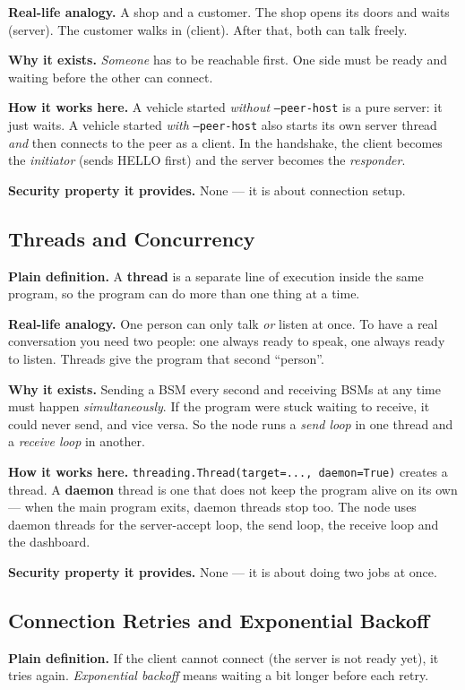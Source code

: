 \documentclass[11pt,a4paper]{article}
\begin{document}
\textbf{Real-life analogy.} A shop and a customer. The shop opens its doors and
waits (server). The customer walks in (client). After that, both can talk freely.

\textbf{Why it exists.} \emph{Someone} has to be reachable first. One side must
be ready and waiting before the other can connect.

\textbf{How it works here.} A vehicle started \emph{without} \texttt{--peer-host}
is a pure server: it just waits. A vehicle started \emph{with}
\texttt{--peer-host} also starts its own server thread \emph{and} then connects
to the peer as a client. In the handshake, the client becomes the
\emph{initiator} (sends HELLO first) and the server becomes the
\emph{responder}.

\textbf{Security property it provides.} None --- it is about connection setup.

\subsection{Threads and Concurrency}
\textbf{Plain definition.} A \textbf{thread} is a separate line of execution
inside the same program, so the program can do more than one thing at a time.

\textbf{Real-life analogy.} One person can only talk \emph{or} listen at once. To
have a real conversation you need two people: one always ready to speak, one
always ready to listen. Threads give the program that second ``person''.

\textbf{Why it exists.} Sending a BSM every second and receiving BSMs at any time
must happen \emph{simultaneously}. If the program were stuck waiting to receive,
it could never send, and vice versa. So the node runs a \emph{send loop} in one
thread and a \emph{receive loop} in another.

\textbf{How it works here.} \texttt{threading.Thread(target=..., daemon=True)}
creates a thread. A \textbf{daemon} thread is one that does not keep the program
alive on its own --- when the main program exits, daemon threads stop too. The
node uses daemon threads for the server-accept loop, the send loop, the receive
loop and the dashboard.

\textbf{Security property it provides.} None --- it is about doing two jobs at once.

\subsection{Connection Retries and Exponential Backoff}
\textbf{Plain definition.} If the client cannot connect (the server is not ready
yet), it tries again. \emph{Exponential backoff} means waiting a bit longer
before each retry.
\end{document}
